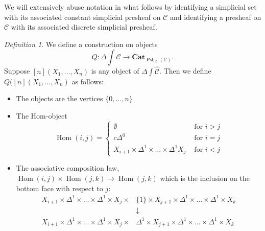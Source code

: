 \documentclass{amsart}
\numberwithin{equation}{section}
\theoremstyle{plain}   %
\theoremstyle{remark}
\newtheorem{defn}[subsection]{Definition}
\theoremstyle{plain}
\DeclareMathOperator{\Psh}{Psh}
\newcommand{\Cat}{\ensuremath{\mathbf{Cat}}}
\DeclareMathOperator{\Hom}{Hom}
\newcommand{\psh}[1]{\ensuremath{\widehat{#1}}}
\newcommand{\C}{\ensuremath{\mathcal{C}}}
\begin{document}
We will extensively abuse notation in what follows by identifying a simplicial set with its associated constant simplicial presheaf on \(\C\) and identifying a presheaf on \(\C\) with its associated discrete simplicial presheaf.

\begin{defn}
	We define a construction on objects \[Q:\Delta\int\psh{\C}\to \Cat_{\Psh_\Delta(\C)}.\] Suppose \([n](X_1,\dots, X_n)\) is any object of \(\Delta\int\psh{\C}\). Then we define \(Q([n](X_1,\dots,X_n)\) as follows:
	\begin{itemize}
		\item The objects are the vertices \(\{0,\dots,n\}\)
		\item The Hom-object
		      \[\Hom(i,j)=
			      \begin{cases}
				      \emptyset                                                & \text{ for } i>j \\
				      c\Delta^0                                                & \text{ for } i=j \\
				      X_{i+1} \times \Delta^1 \times \dots \times \Delta^1 X_j & \text{ for } i<j
			      \end{cases}
		      \]
		\item The associative composition law, \(\Hom(i,j)\times \Hom(j,k)\to \Hom(j,k)\) which is the inclusion on the bottom face with respect to \(j\):
		      \begin{align*}
			      X_{i+1}\times \Delta^1\times\dots\times\Delta^1\times X_j \times & \{1\}\times X_{j+1} \times \Delta^1\times\dots\times\Delta^1\times X_k    \\
			                                                                       & \downarrow                                                                \\
			      X_{i+1}\times \Delta^1\times\dots\times\Delta^1\times X_j\times  & \Delta^1\times X_{j+1} \times \Delta^1\times\dots\times\Delta^1\times X_k
		      \end{align*}
	\end{itemize}
\end{defn}
\end{document}
